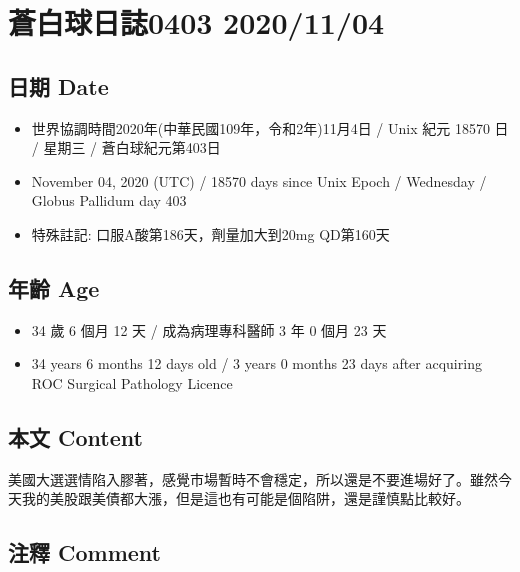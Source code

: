 \documentclass[a5paper, 11pt
]{book}
\providecommand{\tightlist}{%
  \setlength{\itemsep}{0pt}\setlength{\parskip}{0pt}}
\begin{document}
\hypertarget{ux84bcux767dux7403ux65e5ux8a8c0403-20201104}{%
\section{蒼白球日誌0403
2020/11/04}\label{ux84bcux767dux7403ux65e5ux8a8c0403-20201104}}

\hypertarget{ux65e5ux671f-date-61}{%
\subsection{日期 Date}\label{ux65e5ux671f-date-61}}

\begin{itemize}
\tightlist
\item
  世界協調時間2020年(中華民國109年，令和2年)11月4日 / Unix 紀元 18570 日
  / 星期三 / 蒼白球紀元第403日
\item
  November 04, 2020 (UTC) / 18570 days since Unix Epoch / Wednesday /
  Globus Pallidum day 403
\item
  特殊註記: 口服A酸第186天，劑量加大到20mg QD第160天
\end{itemize}

\hypertarget{ux5e74ux9f61-age-61}{%
\subsection{年齡 Age}\label{ux5e74ux9f61-age-61}}

\begin{itemize}
\tightlist
\item
  34 歲 6 個月 12 天 / 成為病理專科醫師 3 年 0 個月 23 天
\item
  34 years 6 months 12 days old / 3 years 0 months 23 days after
  acquiring ROC Surgical Pathology Licence
\end{itemize}

\hypertarget{ux672cux6587-content-61}{%
\subsection{本文 Content}\label{ux672cux6587-content-61}}

美國大選選情陷入膠著，感覺市場暫時不會穩定，所以還是不要進場好了。雖然今天我的美股跟美債都大漲，但是這也有可能是個陷阱，還是謹慎點比較好。

\hypertarget{ux6ce8ux91cb-comment-61}{%
\subsection{注釋 Comment}\label{ux6ce8ux91cb-comment-61}}
\end{document}

